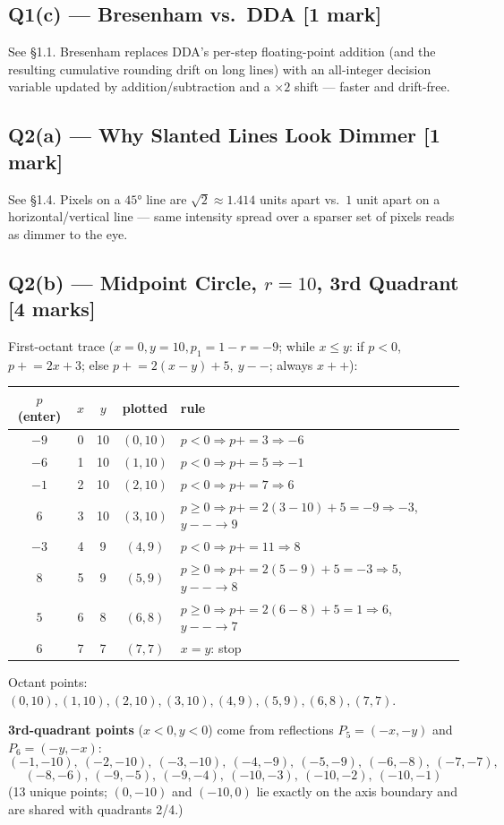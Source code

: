 \documentclass[12pt, a4paper]{article}
\newenvironment{solutionbox}{\begin{mdframed}[style=solutionframe]}{\end{mdframed}}
\newenvironment{answerbox}{\begin{mdframed}[style=answerframe]}{\end{mdframed}}
\begin{document}
\subsection*{Q1(c) --- Bresenham vs.\ DDA [1 mark]}
See \S1.1. Bresenham replaces DDA's per-step floating-point addition (and the resulting cumulative rounding drift on long lines) with an all-integer decision variable updated by addition/subtraction and a $\times2$ shift --- faster and drift-free.

\subsection*{Q2(a) --- Why Slanted Lines Look Dimmer [1 mark]}
See \S1.4. Pixels on a $45°$ line are $\sqrt2\approx1.414$ units apart vs.\ $1$ unit apart on a horizontal/vertical line --- same intensity spread over a sparser set of pixels reads as dimmer to the eye.

\subsection*{Q2(b) --- Midpoint Circle, $r=10$, 3rd Quadrant [4 marks]}
\begin{solutionbox}
First-octant trace ($x=0,y=10,p_1=1-r=-9$; while $x\le y$: if $p<0$, $p\mathrel{+}=2x+3$; else $p\mathrel{+}=2(x-y)+5,\ y{-}{-}$; always $x{+}{+}$):
\begin{center}
\begin{tabular}{ccccl}
\toprule
$p$ (enter) & $x$ & $y$ & plotted & rule \\
\midrule
$-9$ & 0 & 10 & $(0,10)$ & $p<0\Rightarrow p{+}{=}3\Rightarrow-6$ \\
$-6$ & 1 & 10 & $(1,10)$ & $p<0\Rightarrow p{+}{=}5\Rightarrow-1$ \\
$-1$ & 2 & 10 & $(2,10)$ & $p<0\Rightarrow p{+}{=}7\Rightarrow6$ \\
$6$  & 3 & 10 & $(3,10)$ & $p\ge0\Rightarrow p{+}{=}2(3{-}10){+}5{=}{-}9\Rightarrow-3$, $y{-}{-}\to9$ \\
$-3$ & 4 & 9  & $(4,9)$  & $p<0\Rightarrow p{+}{=}11\Rightarrow8$ \\
$8$  & 5 & 9  & $(5,9)$  & $p\ge0\Rightarrow p{+}{=}2(5{-}9){+}5{=}{-}3\Rightarrow5$, $y{-}{-}\to8$ \\
$5$  & 6 & 8  & $(6,8)$  & $p\ge0\Rightarrow p{+}{=}2(6{-}8){+}5{=}1\Rightarrow6$, $y{-}{-}\to7$ \\
$6$  & 7 & 7  & $(7,7)$  & $x=y$: stop \\
\bottomrule
\end{tabular}
\end{center}
Octant points: $(0,10),(1,10),(2,10),(3,10),(4,9),(5,9),(6,8),(7,7)$.
\end{solutionbox}
\begin{answerbox}
\textbf{3rd-quadrant points} ($x<0,y<0$) come from reflections $P_5=(-x,-y)$ and $P_6=(-y,-x)$:
$$(-1,-10),\ (-2,-10),\ (-3,-10),\ (-4,-9),\ (-5,-9),\ (-6,-8),\ (-7,-7),$$
$$(-8,-6),\ (-9,-5),\ (-9,-4),\ (-10,-3),\ (-10,-2),\ (-10,-1)$$
(13 unique points; $(0,-10)$ and $(-10,0)$ lie exactly on the axis boundary and are shared with quadrants 2/4.)
\end{answerbox}
\end{document}
